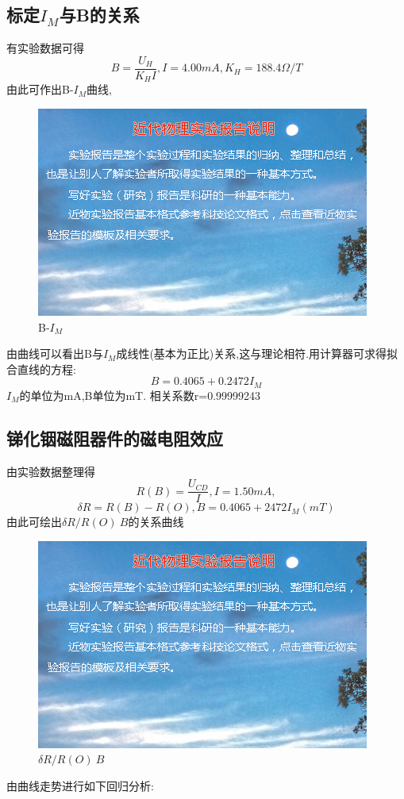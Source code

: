 \documentclass{thuemp}
\begin{document}
\subsection{标定$I_{M}$与B的关系}
有实验数据可得
\[B=\frac{U_{H}}{K_{H}I},I=4.00mA,K_{H}=188.4 \Omega/T\]
由此可作出B-$I_{M}$曲线,
\begin{figure}[H]
	\centering
	\includegraphics[width=0.8\linewidth]{./image/example.jpg}
	\caption{B-$I_{M}$} \label{fig:eg}
\end{figure}
由曲线可以看出B与$I_{M}$成线性(基本为正比)关系,这与理论相符.用计算器可求得拟合直线的方程:
\[B=0.4065+0.2472I_{M}\]
$I_{M}$的单位为mA,B单位为mT.
相关系数r=0.99999243
\subsection{锑化铟磁阻器件的磁电阻效应}
由实验数据整理得
\[R(B)=\frac{U_{CD}}{I} ,I=1.50mA,\]
\[\delta R=R(B)-R(O),B=0.4065+2472I_{M}(mT)\]
由此可绘出$\delta R/R(O)~B$的关系曲线
\begin{figure}[H]
	\centering
	\includegraphics[width=0.8\linewidth]{./image/example.jpg}
	\caption{$\delta R/R(O)~B$} \label{fig:eg}
\end{figure}
由曲线走势进行如下回归分析:
\end{document}

